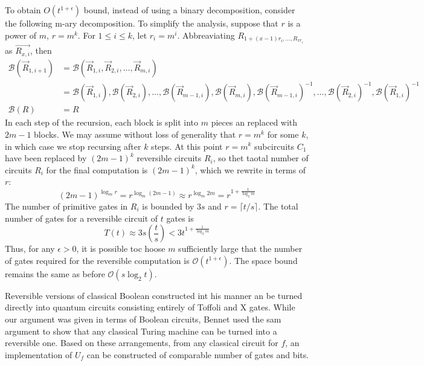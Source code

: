To obtain $O(t^{1+\epsilon})$ bound, instead of using a binary decomposition, consider the following m-ary decomposition. To simplify the analysis, suppose that $r$ is a power of $m$, $r=m^k$. For $1 \leq i\leq k$, let $r_i=m^{i}$. Abbreaviating $R_{1+(x-1)r_i,\ldots,R_{xr_i}}$ as $\vec{R_{x,i}}$, then
\begin{align*}
    \mathcal{B}(\vec{R}_{1,i+1})&=\mathcal{B}(\vec{R}_{1,i},\vec{R}_{2,i},\ldots,\vec{R}_{m,i})\\
    &=\mathcal{B}(\vec{R}_{1,i}),\mathcal{B}(\vec{R}_{2,i}),\ldots,\mathcal{B}(\vec{R}_{m-1,i}),\mathcal{B}(\vec{R}_{m,i}),\mathcal{B}(\vec{R}_{m-1,i})^{-1},\ldots,\mathcal{B}(\vec{R}_{2,i})^{-1},\mathcal{B}(\vec{R}_{1,i})^{-1}\\
    \mathcal{B}(R)&=R
\end{align*}
In each step of the recursion, each block is split into $m$ pieces an replaced with $2m-1$ blocks. We may assume without loss of generality that $r=m^k$ for some $k$, in which case we stop recursing after $k$ steps. At this point $r=m^k$ subcircuits $C_1$ have been replaced by $(2m-1)^k$ reversible circuits $R_i$, so thet taotal number of circuits $R_i$ for the final computation is $(2m-1)^k$, which we rewrite in terms of $r$:
\[
(2m-1)^{\log_m r}=r^{\log_m (2m-1)}\approx r^{\log_m2m}=r^{1+\frac{1}{\log_2 m}}
\]
The number of primitive gates in $R_i$ is bounded by $3s$ and $r=\lceil t/s\rceil$. The total number of gates for a reversible circuit of $t$ gates is 
\[
T(t)\approx 3s\left(\frac{t}{s}\right)<3t^{1+\frac{1}{\log_2m}}
\]
Thus, for any $\epsilon>0$, it is possible toc hoose $m$ sufficiently large that the number of gates required for the reversible computation is $\mathcal{O}(t^{1+\epsilon})$. The space bound remains the same as before $\mathcal{O}(s\log_2 t)$.

Reversible versions of classical Boolean constructed int his manner an be turned directly into quantum circuits consisting entirely of Toffoli and X gates. While our argument was given in terms of Boolean circuits, Bennet used the sam argument to show that any classical Turing machine can be turned into a reversible one. Based on these arrangements, from any classical circuit for $f$, an implementation of $U_f$ can be constructed of comparable number of gates and bits.

